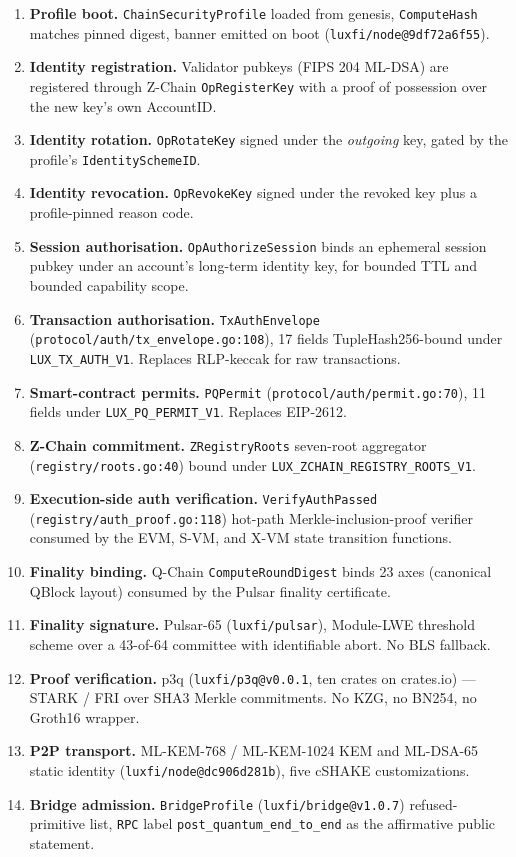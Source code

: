 \begin{enumerate}[leftmargin=2em,nosep]
  \item \textbf{Profile boot.} \texttt{ChainSecurityProfile} loaded from
    genesis, \texttt{ComputeHash} matches pinned digest, banner emitted on
    boot (\texttt{luxfi/node@9df72a6f55}).
  \item \textbf{Identity registration.} Validator pubkeys (FIPS 204 ML-DSA)
    are registered through Z-Chain \texttt{OpRegisterKey} with a proof of
    possession over the new key's own AccountID.
  \item \textbf{Identity rotation.} \texttt{OpRotateKey} signed under the
    \emph{outgoing} key, gated by the profile's
    \texttt{IdentitySchemeID}.
  \item \textbf{Identity revocation.} \texttt{OpRevokeKey} signed under the
    revoked key plus a profile-pinned reason code.
  \item \textbf{Session authorisation.} \texttt{OpAuthorizeSession} binds an
    ephemeral session pubkey under an account's long-term identity key, for
    bounded TTL and bounded capability scope.
  \item \textbf{Transaction authorisation.}
    \texttt{TxAuthEnvelope} (\texttt{protocol/auth/tx\_envelope.go:108}),
    17 fields TupleHash256-bound under \texttt{LUX\_TX\_AUTH\_V1}. Replaces
    RLP-keccak for raw transactions.
  \item \textbf{Smart-contract permits.} \texttt{PQPermit}
    (\texttt{protocol/auth/permit.go:70}), 11 fields under
    \texttt{LUX\_PQ\_PERMIT\_V1}. Replaces EIP-2612.
  \item \textbf{Z-Chain commitment.} \texttt{ZRegistryRoots} seven-root
    aggregator (\texttt{registry/roots.go:40}) bound under
    \texttt{LUX\_ZCHAIN\_REGISTRY\_ROOTS\_V1}.
  \item \textbf{Execution-side auth verification.}
    \texttt{VerifyAuthPassed} (\texttt{registry/auth\_proof.go:118}) hot-path
    Merkle-inclusion-proof verifier consumed by the EVM, S-VM, and X-VM
    state transition functions.
  \item \textbf{Finality binding.} Q-Chain
    \texttt{ComputeRoundDigest} binds 23 axes (canonical QBlock layout)
    consumed by the Pulsar finality certificate.
  \item \textbf{Finality signature.} Pulsar-65
    (\texttt{luxfi/pulsar}), Module-LWE threshold scheme over a
    43-of-64 committee with identifiable abort. No BLS fallback.
  \item \textbf{Proof verification.} p3q
    (\texttt{luxfi/p3q@v0.0.1}, ten crates on crates.io) --- STARK / FRI
    over SHA3 Merkle commitments. No KZG, no BN254, no Groth16 wrapper.
  \item \textbf{P2P transport.} ML-KEM-768 / ML-KEM-1024 KEM and ML-DSA-65
    static identity (\texttt{luxfi/node@dc906d281b}), five cSHAKE
    customizations.
  \item \textbf{Bridge admission.} \texttt{BridgeProfile}
    (\texttt{luxfi/bridge@v1.0.7}) refused-primitive list, \texttt{RPC} label
    \texttt{post\_quantum\_end\_to\_end} as the affirmative public statement.
\end{enumerate}

